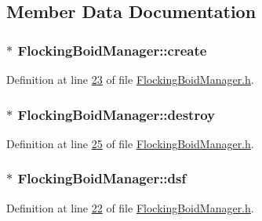 \subsection{Member Data Documentation}
\hypertarget{class_flocking_boid_manager_adba8774f051608d3aa3591cd848087bb}{}
\subsubsection[{create}]{$\ast$ Flocking\+Boid\+Manager\+::create}\label{class_flocking_boid_manager_adba8774f051608d3aa3591cd848087bb}


Definition at line \hyperlink{_flocking_boid_manager_8h_source_l00023}{23} of file \hyperlink{_flocking_boid_manager_8h_source}{Flocking\+Boid\+Manager.\+h}.

\hypertarget{class_flocking_boid_manager_a71e9958bd298f68630681364bd0677f8}{}
\subsubsection[{destroy}]{$\ast$ Flocking\+Boid\+Manager\+::destroy}\label{class_flocking_boid_manager_a71e9958bd298f68630681364bd0677f8}


Definition at line \hyperlink{_flocking_boid_manager_8h_source_l00025}{25} of file \hyperlink{_flocking_boid_manager_8h_source}{Flocking\+Boid\+Manager.\+h}.

\hypertarget{class_flocking_boid_manager_a9a564c99978c8e6115562472544bb839}{}
\subsubsection[{dsf}]{$\ast$ Flocking\+Boid\+Manager\+::dsf}\label{class_flocking_boid_manager_a9a564c99978c8e6115562472544bb839}


Definition at line \hyperlink{_flocking_boid_manager_8h_source_l00022}{22} of file \hyperlink{_flocking_boid_manager_8h_source}{Flocking\+Boid\+Manager.\+h}.

